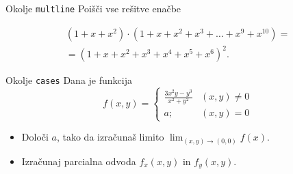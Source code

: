 \begin{frame}{Okolje \texttt{multline}}
	Poišči vse rešitve enačbe
	
	
	\begin{multline*}
		(1+x+x^2) \cdot (1+x+x^2+x^3+\ldots+x^9+x^{10}) = \\
		=(1+x+x^2+x^3+x^4+x^5+x^6)^2.
	\end{multline*}
	
\end{frame}

\begin{frame}{Okolje \texttt{cases}}
	Dana je funkcija
	\[
	f(x,y) =
	\begin{cases}
	\frac{3x^2y-y^3}{x^2+y^2} & (x,y)\neq 0 \\
	a; & (x,y) = 0
	\end{cases}	
    \]
	
	\begin{itemize}
	\item Določi $a$, tako da izračunaš limito \( \lim_{(x,y)\to(0,0)} f(x). \)
	\item Izračunaj parcialna odvoda $f_x(x,y)$ in $f_y(x,y)$.
	\end{itemize}
\end{frame}
